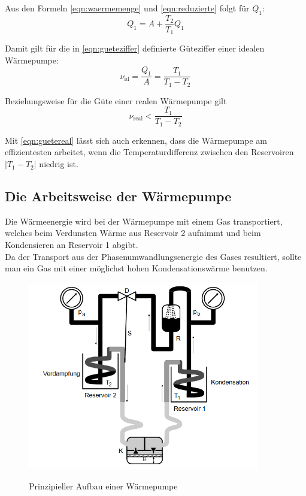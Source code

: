 Aus den Formeln \ref{eqn:waermemenge} und \ref{eqn:reduzierte} folgt für $Q_1$:
\begin{equation}
	Q_1 = A + \frac{T_2}{T_1} Q_1
	\label{eqn:q1}
\end{equation}

Damit gilt für die in \ref{eqn:gueteziffer} definierte Güteziffer einer idealen Wärmepumpe:
\begin{equation}
	\nu_\text{id} = \frac{Q_1}{A} = \frac{T_1}{T_1 - T_2}
	\label{eqn:gueteideal}
\end{equation}

Beziehungsweise für die Güte einer realen Wärmepumpe gilt
\begin{equation}
	\nu_\text{real} <
	\frac{T_1}{T_1 - T_2}
	\label{eqn:guetereal}
\end{equation}

Mit \ref{eqn:guetereal} lässt sich auch erkennen, dass die Wärmepumpe am effizientesten arbeitet,
wenn die Temperaturdifferenz zwischen den Reservoiren $\vert T_1 - T_2 \vert$ niedrig ist.

\subsection{Die Arbeitsweise der Wärmepumpe}

Die W\"armeenergie wird bei der W\"armepumpe mit einem Gas transportiert, welches beim
Verdunsten W\"arme aus Reservoir 2 aufnimmt und beim Kondensieren an Reservoir 1 abgibt.
\\
Da der Transport aus der Phasenumwandlungsenergie des Gases resultiert, sollte man ein Gas mit einer
m\"oglichst hohen Kondensationsw\"arme benutzen.

\begin{figure}[H]
	\centering
	\includegraphics[width=0.9\textwidth]{content/aufbau.jpg}
	\caption{Prinzipieller Aufbau einer W\"armepumpe}
	\cite{anleitung}
	\label{fig:aufbau}
\end{figure}

